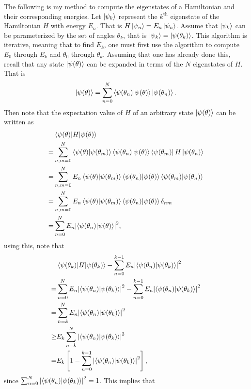 \documentclass[Dual]{msu-thesis}
\begin{document}
The following is my method to compute the eigenstates of a Hamiltonian and their corresponding energies. Let $\ket{\psi_k}$ represent the $k^{\text{th}}$ eigenstate of the Hamiltonian $H$ with energy $E_n$. That is
$H\ket{\psi_n}=E_n\ket{\psi_n}$.
Assume that $\ket{\psi_k}$ can be parameterized by the set of angles $\theta_k$, that is $\ket{\psi_k}=\ket{\psi(\theta_k)}$. This algorithm is iterative, meaning that to find $E_k$, one must first use the algorithm to compute $E_0$ through $E_k$ and $\theta_0$ through $\theta_k$. Assuming that one has already done this, recall that any state $\ket{\psi(\theta)}$ can be expanded in terms of the $N$ eigenstates of $H$. That is
\begin{align}
\ket{\psi(\theta)}=\sum_{n=0}^{N}\bra{\psi(\theta_n)}\ket{\psi(\theta)}\ket{\psi(\theta_n)}
.\end{align}
Then note that the expectation value of $H$ of an arbitrary state $\ket{\psi(\theta)}$ can be written as
\begin{align}
&\mel{\psi(\theta)}{H}{\psi(\theta)} \\
=&\sum_{n,m=0}^{N}\bra{\psi(\theta)}\ket{\psi(\theta_m)}\bra{\psi(\theta_n)}\ket{\psi(\theta)}\bra{\psi(\theta_m)}H\ket{\psi(\theta_n)} \\
=&\sum_{n,m=0}^{N}E_n\bra{\psi(\theta)}\ket{\psi(\theta_m)}\bra{\psi(\theta_n)}\ket{\psi(\theta)}\bra{\psi(\theta_m)}\ket{\psi(\theta_n)} \\
=&\sum_{n,m=0}^{N}E_n\bra{\psi(\theta)}\ket{\psi(\theta_m)}\bra{\psi(\theta_n)}\ket{\psi(\theta)}\delta_{nm} \\
=&\sum_{n=0}^{N}E_n\abs{\bra{\psi(\theta_n)}\ket{\psi(\theta)}}^2
,\end{align}
using this, note that
\begin{align}
&\mel{\psi(\theta_k)}{H}{\psi(\theta_k)}-\sum_{n=0}^{k-1}E_n\abs{\bra{\psi(\theta_n)}\ket{\psi(\theta_k)}}^2 \\
=&\sum_{n=0}^{N}E_n\abs{\bra{\psi(\theta_n)}\ket{\psi(\theta_k)}}^2-\sum_{n=0}^{k-1}E_n\abs{\bra{\psi(\theta_n)}\ket{\psi(\theta_k)}}^2 \\
=&\sum_{n=k}^{N}E_n\abs{\bra{\psi(\theta_n)}\ket{\psi(\theta_k)}}^2 \\
\geq& E_k\sum_{n=k}^{N}\abs{\bra{\psi(\theta_n)}\ket{\psi(\theta_k)}}^2 \\
=&E_k\left[1-\sum_{n=0}^{k-1}\abs{\bra{\psi(\theta_n)}\ket{\psi(\theta_k)}}^2\right]
,\end{align}
since $\sum_{n=0}^{N}\abs{\bra{\psi(\theta_n)}\ket{\psi(\theta_k)}}^2=1$. This implies that
\end{document}
